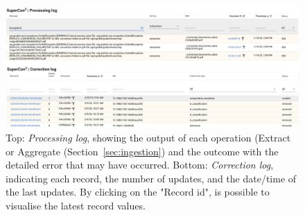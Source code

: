 \documentclass[]{interact}
\theoremstyle{plain} %
\theoremstyle{definition}
\theoremstyle{remark}
\begin{document}
\begin{figure}[ht]
  \centering
  \includegraphics[width=1\textwidth]{images/processing-curation-log.png} 
  \caption{Top: \textit{Processing log}, showing the output of each operation (Extract or Aggregate (Section~\ref{sec:ingestion}) and the outcome with the detailed error that may have occurred. Bottom: \textit{Correction log}, indicating each record, the number of updates, and the date/time of the last updates. By clicking on the "Record id", is possible to visualise the latest record values.}
  \label{fig:processing-curation-log}
\end{figure}
\end{document}
